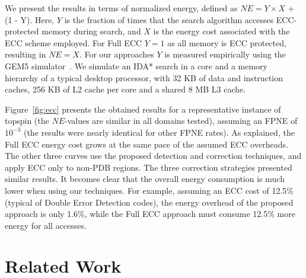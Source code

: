 \documentclass[letterpaper]{article}
\begin{document}
We present the results in terms of normalized energy, defined as $NE = Y \times X$ + (1 - Y). Here, $Y$ is the fraction of times that the search algorithm accesses ECC-protected memory during search, and $X$ is the energy cost associated with the ECC scheme employed. For Full ECC $Y = 1$ as all memory is ECC protected, resulting in $NE = X$. For our approaches $Y$ is measured empirically using the GEM5 simulator~\cite{Binkert2011}. We simulate an IDA* search in a core and a memory hierarchy of a typical desktop processor, with 32 KB of data and instruction caches, 256 KB of L2 cache per core and a shared 8 MB L3 cache.




Figure~\ref{fig:ecc} presents the obtained results for a representative instance of topspin (the $NE$-values are similar in all domains tested), assuming an FPNE of $10^{-3}$ (the results were nearly identical for other FPNE rates). As explained, the Full ECC energy cost grows at the same pace of the assumed ECC overheads. The other three curves use the proposed detection and correction techniques, and apply ECC only to non-PDB regions. The three correction strategies presented similar results.  It becomes clear that the overall energy consumption is much lower when using our techniques. For example, assuming an ECC cost of 12.5\% (typical of Double Error Detection codes), the energy overhead of the proposed approach is only 1.6\%, while the Full ECC approach must consume 12.5\% more energy for all accesses.



\section{Related Work}
\end{document}
